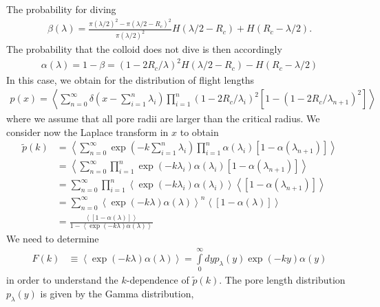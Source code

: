 \documentclass[singlecolumn,pre,notitlepage,preprintnumbers,floatfix,superscriptaddress]{revtex4-1}
\begin{document}
The probability for diving
%
\begin{align}
\beta(\lambda) = \frac{\pi (\lambda/2)^2 - \pi (\lambda/2-R_c)^2}{\pi (\lambda/2)^2}
H(\lambda/2 - R_c) + H(R_c - \lambda/2). 
\end{align}
%
The probability that the colloid does not dive is then accordingly
%
\begin{align}
\alpha(\lambda) = 1 - \beta = (1-2 R_c/\lambda)^2
H(\lambda/2 - R_c)  - H(R_c - \lambda/2) 
\end{align}
%
In this case, we obtain for the distribution of flight lengths
%
\begin{align}
p(x) = \left\langle \sum\limits_{n = 0}^\infty \delta\left(x - \sum\limits_{i = 1}^n \lambda_i\right) \prod\limits_{i = 1}^n (1-2 R_c/\lambda_i)^2
[1 - (1-2 R_c/\lambda_{n+1})^2] \right\rangle
\end{align}
%
where we assume that all pore radii are larger than the critical radius. We consider now the Laplace transform in $x$ to obtain
%
\begin{align}
\widetilde p(k) &= \left\langle \sum\limits_{n = 0}^\infty \exp\left(- k \sum\limits_{i = 1}^n \lambda_i\right) \prod\limits_{i = 1}^n \alpha(\lambda_i)
[1 - \alpha(\lambda_{n+1})] \right\rangle
\nonumber\\
&= \left\langle \sum\limits_{n = 0}^\infty \prod\limits_{i = 1}^n \exp\left(- k \lambda_i\right)  \alpha(\lambda_i)
[1 - \alpha(\lambda_{n+1})] \right\rangle
\nonumber\\
&= \sum\limits_{n = 0}^\infty \prod\limits_{i = 1}^n \left\langle \exp\left(- k
\lambda_i\right) \alpha(\lambda_i) \right\rangle
\left\langle [1 - \alpha(\lambda_{n+1})] \right\rangle
\nonumber\\
&= \sum\limits_{n = 0}^\infty \left\langle \exp\left(- k
\lambda\right) \alpha(\lambda) \right\rangle^n
\left\langle [1 - \alpha(\lambda)] \right\rangle
\nonumber\\
&= \frac{\left\langle [1 - \alpha(\lambda)] \right\rangle}{1 - \left\langle \exp\left(- k
\lambda\right)  \alpha(\lambda)\right\rangle}
\end{align}
%
We need to determine
%
\begin{align}
F(k)&\equiv \left\langle \exp\left(- k \lambda\right)  \alpha(\lambda)\right\rangle =
\int\limits_{0}^\infty d y p_\lambda(y) \exp\left(- k y\right)  \alpha(y)
\end{align}
%
in order to understand the $k$-dependence of $\widetilde p(k)$. The pore length distribution $p_\lambda(y)$ is given by the Gamma distribution,
\end{document}
